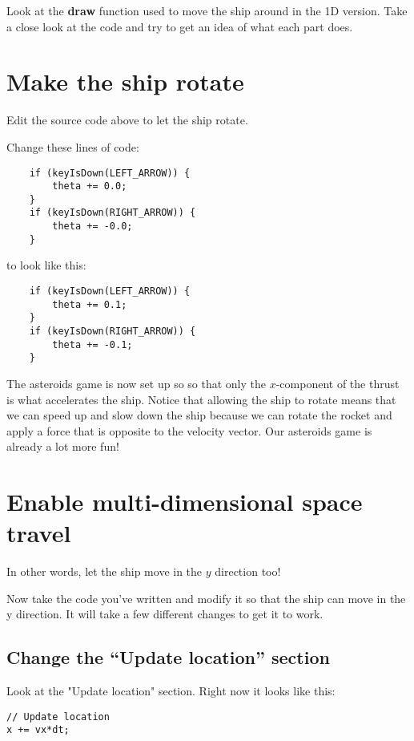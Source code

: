 \documentclass{ximera}
\begin{document}
Look at the \textbf{draw} function used to move the ship around in the
1D version. Take a close look at the code and try to get an idea of
what each part does.

\section{Make the ship rotate}

Edit the source code above to let the ship rotate.

Change these lines of code:

\begin{verbatim}
    if (keyIsDown(LEFT_ARROW)) {
        theta += 0.0;
    } 
    if (keyIsDown(RIGHT_ARROW)) {
        theta += -0.0;
    }
\end{verbatim}

to look like this:

\begin{verbatim}
    if (keyIsDown(LEFT_ARROW)) {
        theta += 0.1;
    } 
    if (keyIsDown(RIGHT_ARROW)) {
        theta += -0.1;
    }
\end{verbatim}

The asteroids game is now set up so so that only the $x$-component of
the thrust is what accelerates the ship. Notice that allowing the ship
to rotate means that we can speed up and slow down the ship because we
can rotate the rocket and apply a force that is opposite to the
velocity vector. Our asteroids game is already a lot more fun!

\section{Enable multi-dimensional space travel}

In other words, let the ship move in the $y$ direction too!

Now take the code you've written and modify it so that the ship can
move in the y direction. It will take a few different changes to get
it to work.

\subsection{Change the ``Update location'' section}

Look at the "Update location" section. Right now it looks like this:

\begin{verbatim}
// Update location
x += vx*dt;
\end{verbatim}
\end{document}
